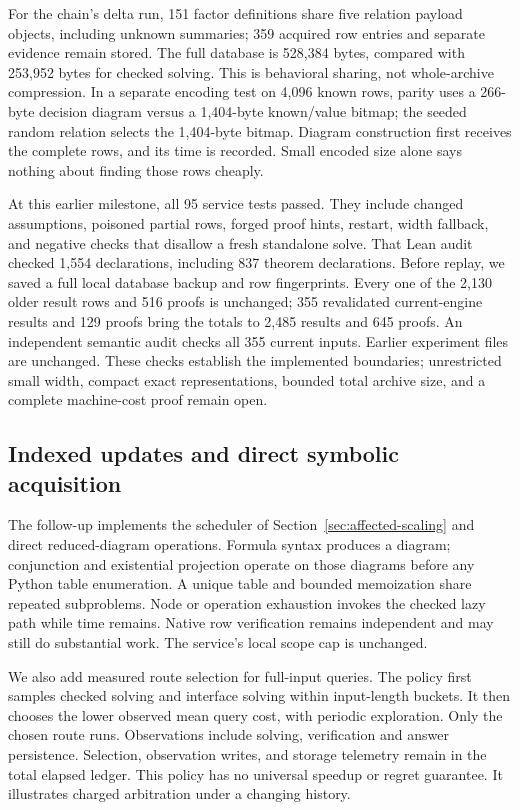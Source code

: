 \documentclass[11pt,a4paper]{article}
\numberwithin{equation}{section}
\theoremstyle{plain}
\theoremstyle{definition}
\theoremstyle{remark}
\begin{document}
For the chain's delta run, 151 factor definitions share five relation payload objects, including unknown summaries; 359 acquired row entries and separate evidence remain stored. The full database is 528,384 bytes, compared with 253,952 bytes for checked solving. This is behavioral sharing, not whole-archive compression. In a separate encoding test on 4,096 known rows, parity uses a 266-byte decision diagram versus a 1,404-byte known/value bitmap; the seeded random relation selects the 1,404-byte bitmap. Diagram construction first receives the complete rows, and its time is recorded. Small encoded size alone says nothing about finding those rows cheaply.

At this earlier milestone, all 95 service tests passed. They include changed assumptions, poisoned partial rows, forged proof hints, restart, width fallback, and negative checks that disallow a fresh standalone solve. That Lean audit checked 1,554 declarations, including 837 theorem declarations. Before replay, we saved a full local database backup and row fingerprints. Every one of the 2,130 older result rows and 516 proofs is unchanged; 355 revalidated current-engine results and 129 proofs bring the totals to 2,485 results and 645 proofs. An independent semantic audit checks all 355 current inputs. Earlier experiment files are unchanged. These checks establish the implemented boundaries; unrestricted small width, compact exact representations, bounded total archive size, and a complete machine-cost proof remain open.


\subsection{Indexed updates and direct symbolic acquisition}
\label{sec:scaling-study}

The follow-up implements the scheduler of Section~\ref{sec:affected-scaling} and direct reduced-diagram operations. Formula syntax produces a diagram; conjunction and existential projection operate on those diagrams before any Python table enumeration. A unique table and bounded memoization share repeated subproblems. Node or operation exhaustion invokes the checked lazy path while time remains. Native row verification remains independent and may still do substantial work. The service's local scope cap is unchanged.

We also add measured route selection for full-input queries. The policy first samples checked solving and interface solving within input-length buckets. It then chooses the lower observed mean query cost, with periodic exploration. Only the chosen route runs. Observations include solving, verification and answer persistence. Selection, observation writes, and storage telemetry remain in the total elapsed ledger. This policy has no universal speedup or regret guarantee. It illustrates charged arbitration under a changing history.
\end{document}

